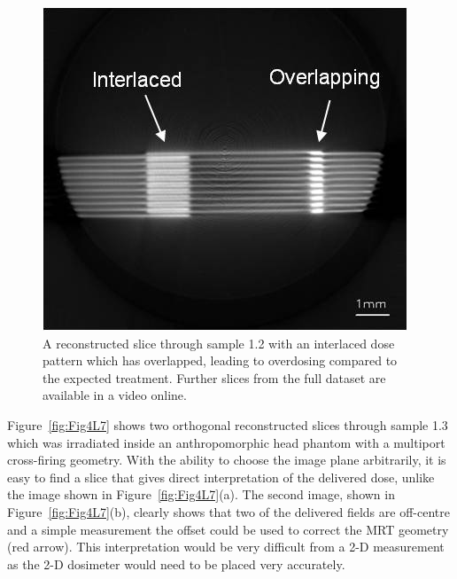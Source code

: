 	\begin{figure}
		\centering
		\includegraphics[width=0.7\linewidth]{mrt_img/mrt_Fig3}
		\caption{A reconstructed slice through sample 1.2 with an interlaced dose pattern which has overlapped, leading to overdosing compared to the expected treatment. Further slices from the full dataset are available in a video online.}
		\label{fig:Fig3S9}
	\end{figure}
	
	
	Figure~\ref{fig:Fig4L7} shows two orthogonal reconstructed slices through sample 1.3 which was irradiated inside an anthropomorphic head phantom with a multiport cross-firing geometry. With the ability to choose the image plane arbitrarily, it is easy to find a slice that gives direct interpretation of the delivered dose, unlike the image shown in Figure~\ref{fig:Fig4L7}(a). The second image, shown in Figure~\ref{fig:Fig4L7}(b), clearly shows that two of the delivered fields are off-centre and a simple measurement the offset could be used to correct the MRT geometry (red arrow). This interpretation would be very difficult from a 2-D measurement as the 2-D dosimeter would need to be placed very accurately. 
	
